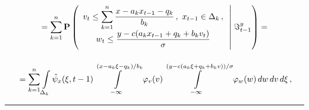   \noindent
  \begin{multline*}
{}=
\sum\limits_{k=1}^n \mathbf{P}\left( 
\begin{array}{c}
v_t\leq \displaystyle \sum\limits_{k=1}^n \fr{x-a_kx_{t-1}-q_k}{b_k}\,,\ x_{t-1}\in 
\Delta_k\,,\\[9pt]
w_t\leq \fr{y-c(a_kx_{t-1}+q_k+b_k v_t)}{\sigma}
\end{array} 
\left\vert \vphantom{\begin{array}{c}
v_t\leq \displaystyle \sum\limits_{k=1}^n \fr{x-a_kx_{t-1}-q_k}{b_k}\,,\ x_{t-1}\in 
\Delta_k\,,\\[9pt]
w_t\leq \fr{y-c(a_kx_{t-1}+q_k+b_k v_t)}{\sigma}
\end{array} }\right.
 \Im^y_{t-1}\right)={}\\[12pt]
{}=\sum\limits_{k=1}^n \int\limits_{\Delta_k} \hat{\psi}_x(\xi, t-1) \int\limits_{-\infty}^{(x-
a_k\xi-q_k)/b_k} \varphi_v(v) \int\limits_{-\infty}^{(y-
c(a_k\xi+q_k+b_kv))/\sigma}\varphi_w(w)\,dw\, dv\, d\xi\,,
\end{multline*}

  \vspace*{9pt}

\hrule

  \vspace*{3pt}

